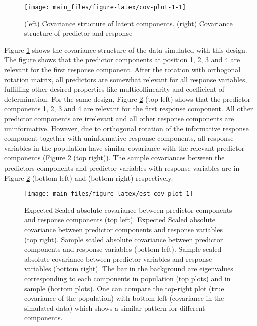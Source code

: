 \documentclass[12pt,3p,authoryear]{elsarticle}
\begin{document}
\begin{figure}
\texttt{[image: main\_files/figure-latex/cov-plot-1-1]} \caption{(left) Covariance structure of latent components. (right) Covariance structure of predictor and response}\label{fig:cov-plot-1}
\end{figure}

Figure \ref{fig:cov-plot-1} shows the covariance structure of the data
simulated with this design. The figure shows that the predictor
components at position 1, 2, 3 and 4 are relevant for the first response
component. After the rotation with orthogonal rotation matrix, all
predictors are somewhat relevant for all response variables, fulfilling
other desired properties like multicollinearity and coefficient of
determination. For the same design, Figure \ref{fig:est-cov-plot} (top
left) shows that the predictor components 1, 2, 3 and 4 are relevant for
the first response component. All other predictor components are
irrelevant and all other response components are uninformative. However,
due to orthogonal rotation of the informative response component
together with uninformative response components, all response variables
in the population have similar covariance with the relevant predictor
components (Figure \ref{fig:est-cov-plot} (top right)). The sample
covariances between the predictors components and predictor variables
with response variables are in Figure \ref{fig:est-cov-plot} (bottom
left) and (bottom right) respectively.













\begin{figure}
\texttt{[image: main\_files/figure-latex/est-cov-plot-1]} \caption{Expected Scaled absolute covariance between predictor
components and response components (top left). Expected Scaled absolute
covariance between predictor components and response variables (top
right). Sample scaled absolute covariance between predictor components
and response variables (bottom left). Sample scaled absolute covariance
between predictor variables and response variables (bottom right). The
bar in the background are eigenvalues corresponding to each components
in population (top plots) and in sample (bottom plots). One can compare
the top-right plot (true covariance of the population) with bottom-left
(covariance in the simulated data) which shows a similar pattern for
different components.}\label{fig:est-cov-plot}
\end{figure}
\end{document}
